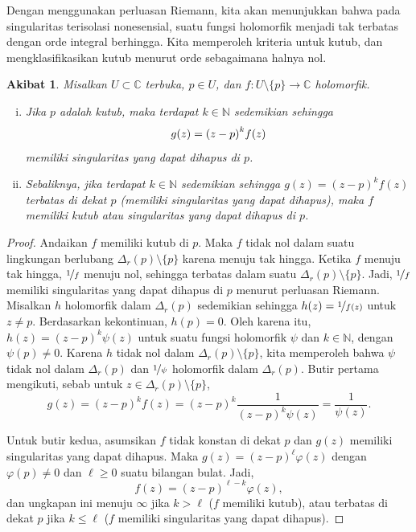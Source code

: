 \documentclass[12pt,openany]{book}
\newcommand{\avoidbreak}{\postdisplaypenalty=100}
\newcommand{\C}{{\mathbb{C}}}
\newcommand{\N}{{\mathbb{N}}}
\theoremstyle{plain}
\newtheorem{cor}[thm]{Akibat}
\theoremstyle{remark}
\theoremstyle{definition}
\theoremstyle{exercise}
\theoremstyle{example}
\begin{document}
Dengan menggunakan perluasan Riemann, kita akan menunjukkan bahwa
pada singularitas terisolasi nonesensial,
suatu fungsi holomorfik menjadi tak terbatas dengan orde integral berhingga.
Kita memperoleh kriteria untuk kutub, dan mengklasifikasikan
kutub menurut orde sebagaimana halnya nol.

\begin{cor}
\pagebreak[2]
Misalkan $U \subset \C$ terbuka, $p \in U$,
dan $f \colon U \setminus \{p\} \to \C$ holomorfik.
\begin{enumerate}[(i)]
\item
Jika $p$ adalah kutub, maka terdapat $k \in \N$ sedemikian sehingga
\begin{equation*}
g(z) = {(z-p)}^k f(z)
\avoidbreak
\end{equation*}
memiliki singularitas yang dapat dihapus di $p$.
\item
Sebaliknya, jika terdapat $k \in \N$ sedemikian sehingga
$g(z) = {(z-p)}^k f(z)$ terbatas di dekat $p$ (memiliki singularitas yang dapat dihapus),
maka $f$ memiliki kutub atau
singularitas yang dapat dihapus di $p$.
\end{enumerate}
\end{cor}

\begin{proof}
Andaikan $f$ memiliki kutub di $p$.
Maka $f$ tidak nol dalam suatu
lingkungan berlubang $\Delta_r(p) \setminus \{p\}$ karena menuju tak hingga.
Ketika $f$ menuju tak hingga,
$\nicefrac{1}{f}$ menuju nol, sehingga terbatas dalam suatu $\Delta_r(p)
\setminus \{p\}$.
Jadi, $\nicefrac{1}{f}$ memiliki singularitas yang dapat dihapus di $p$ menurut perluasan Riemann.
Misalkan $h$ holomorfik dalam $\Delta_r(p)$
sedemikian sehingga $h(z) = \nicefrac{1}{f(z)}$ untuk $z \neq p$. Berdasarkan kekontinuan, $h(p) =
0$. Oleh karena itu, $h(z) = {(z-p)}^k \psi(z)$ untuk suatu fungsi holomorfik $\psi$ dan $k \in \N$,
dengan $\psi(p) \neq 0$.
Karena $h$ tidak nol dalam $\Delta_r(p) \setminus \{p\}$,
kita memperoleh bahwa $\psi$ tidak nol dalam $\Delta_r(p)$
dan $\nicefrac{1}{\psi}$ holomorfik dalam $\Delta_r(p)$.
Butir pertama mengikuti, sebab
untuk $z \in \Delta_r(p) \setminus \{p\}$,
\begin{equation*}
g(z) = {(z-p)}^k f(z)
=
{(z-p)}^k \frac{1}{{(z-p)}^k \psi(z)}
=
\frac{1}{\psi(z)} .
\end{equation*}

Untuk butir kedua,
asumsikan $f$ tidak konstan di dekat $p$
dan
$g(z)$ memiliki singularitas yang dapat
dihapus.
Maka $g(z) = {(z-p)}^\ell \varphi(z)$ dengan
$\varphi(p) \neq 0$ dan $\ell \geq 0$ suatu bilangan bulat.
Jadi,
\begin{equation*}
f(z) = {(z-p)}^{\ell-k} \varphi(z) ,
\end{equation*}
dan ungkapan ini menuju $\infty$ jika $k > \ell$ ($f$ memiliki kutub), atau
terbatas di dekat $p$ jika $k \leq \ell$ ($f$ memiliki singularitas yang dapat dihapus).
\end{proof}
\end{document}

